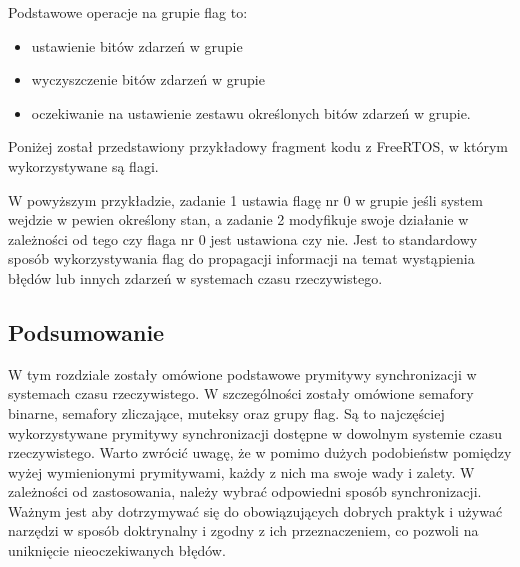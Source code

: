 Podstawowe operacje na grupie flag to:
\begin{itemize}
    \item ustawienie bitów zdarzeń w grupie
    \item wyczyszczenie bitów zdarzeń w grupie
    \item oczekiwanie na ustawienie zestawu określonych bitów zdarzeń w grupie.
\end{itemize}

Poniżej został przedstawiony przykładowy fragment kodu z FreeRTOS, w którym wykorzystywane są flagi.


W powyższym przykładzie, zadanie 1 ustawia flagę nr 0 w grupie jeśli system wejdzie w pewien określony stan, a zadanie 2 modyfikuje swoje działanie
w zależności od tego czy flaga nr 0 jest ustawiona czy nie. Jest to standardowy sposób wykorzystywania flag do propagacji informacji na temat
wystąpienia błędów lub innych zdarzeń w systemach czasu rzeczywistego.

\subsection{Podsumowanie}
W tym rozdziale zostały omówione podstawowe prymitywy synchronizacji w systemach czasu rzeczywistego.
W szczególności zostały omówione semafory binarne, semafory zliczające, muteksy oraz grupy flag. Są to najczęściej wykorzystywane prymitywy synchronizacji
dostępne w dowolnym systemie czasu rzeczywistego. Warto zwrócić uwagę, że w pomimo dużych podobieństw pomiędzy wyżej wymienionymi prymitywami,
każdy z nich ma swoje wady i zalety. W zależności od zastosowania, należy wybrać odpowiedni sposób synchronizacji. Ważnym jest aby
dotrzymywać się do obowiązujących dobrych praktyk i używać narzędzi w sposób doktrynalny i zgodny z ich przeznaczeniem, co pozwoli
na uniknięcie nieoczekiwanych błędów.